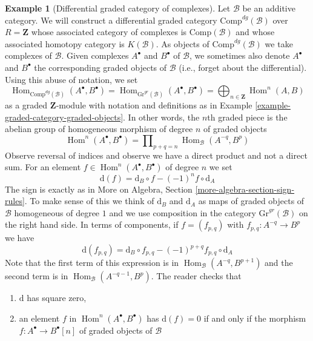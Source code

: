 \documentclass{stacks-project}
\theoremstyle{plain}
\theoremstyle{definition}
\newtheorem{example}[subsection]{Example}
\theoremstyle{remark}
\numberwithin{equation}{subsection}
\def\Hom{\mathop{\mathrm{Hom}}\nolimits}
\begin{document}
\begin{example}[Differential graded category of complexes]
\label{example-category-complexes}
Let $\mathcal{B}$ be an additive category. We will construct
a differential graded category $\text{Comp}^{dg}(\mathcal{B})$
over $R = \mathbf{Z}$ whose associated category of complexes
is $\text{Comp}(\mathcal{B})$ and whose associated homotopy
category is $K(\mathcal{B})$. As objects of $\text{Comp}^{dg}(\mathcal{B})$
we take complexes of $\mathcal{B}$. Given complexes
$A^\bullet$ and $B^\bullet$ of $\mathcal{B}$, we sometimes also
denote $A^\bullet$ and $B^\bullet$ the corresponding graded objects
of $\mathcal{B}$ (i.e., forget about the differential).
Using this abuse of notation, we set
$$
\Hom_{\text{Comp}^{dg}(\mathcal{B})}(A^\bullet, B^\bullet) =
\Hom_{\text{Gr}^{gr}(\mathcal{B})}(A^\bullet, B^\bullet) =
\bigoplus\nolimits_{n \in \mathbf{Z}} \Hom^n(A, B)
$$
as a graded $\mathbf{Z}$-module with notation and definitions as
in Example \ref{example-graded-category-graded-objects}.
In other words, the $n$th graded piece is
the abelian group of homogeneous morphism of degree $n$ of graded objects
$$
\Hom^n(A^\bullet, B^\bullet) =
\prod\nolimits_{p + q = n} \Hom_\mathcal{B}(A^{-q}, B^p)
$$
Observe reversal of indices and observe we have a direct product
and not a direct sum. For an element
$f \in \Hom^n(A^\bullet, B^\bullet)$ of degree $n$ we set
$$
\text{d}(f) = \text{d}_B \circ f - (-1)^n f \circ \text{d}_A
$$
The sign is exactly as in
More on Algebra, Section \ref{more-algebra-section-sign-rules}.
To make sense of this we think of $\text{d}_B$ and $\text{d}_A$
as maps of graded objects of $\mathcal{B}$ homogeneous of degree $1$
and we use composition in the category $\text{Gr}^{gr}(\mathcal{B})$
on the right hand side. In terms of components, if $f = (f_{p, q})$ with
$f_{p, q} : A^{-q} \to B^p$ we have
\begin{equation}
\label{equation-differential-hom-complex}
\text{d}(f_{p, q}) =
\text{d}_B \circ f_{p, q} - (-1)^{p + q} f_{p, q} \circ \text{d}_A 
\end{equation}
Note that the first term of this expression is in
$\Hom_\mathcal{B}(A^{-q}, B^{p + 1})$ and the second term is in
$\Hom_\mathcal{B}(A^{-q - 1}, B^p)$. The reader checks that
\begin{enumerate}
\item $\text{d}$ has square zero,
\item an element $f$ in $\Hom^n(A^\bullet, B^\bullet)$
has $\text{d}(f) = 0$ if and only if the morphism
$f : A^\bullet \to B^\bullet[n]$ of graded objects of $\mathcal{B}$

\end{enumerate}
\end{example}
\end{document}
